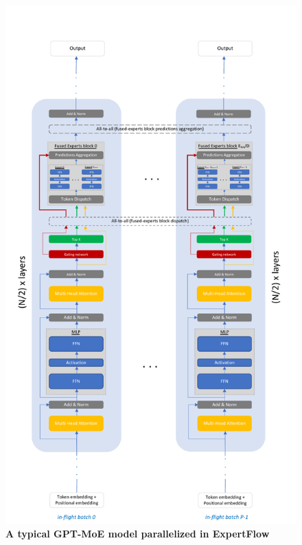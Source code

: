 \begin{figure}[H]
    \centering
    \includegraphics[width=0.85\linewidth]{figures/gpt-moe-illustration.pdf}
    \caption{\textbf{A typical GPT-MoE model parallelized in ExpertFlow}}
    \label{fig:expertflow-gpt-moe}
\end{figure}


